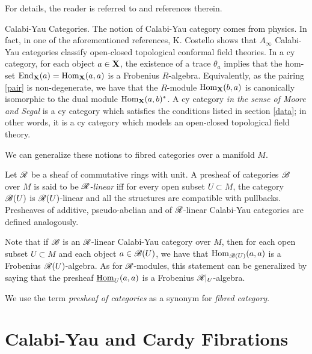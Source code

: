 For details, the reader is referred to
\cite{borceux:_cauchy_completion, natan:_envelope} and
references therein.

{\sc Calabi-Yau Categories.} The notion of Calabi-Yau category comes
from physics. In fact, in one of the aforementioned references,
K. Costello shows that $A_\infty$ Calabi-Yau categories classify
open-closed topological conformal field theories. In a {\sc cy} category,
for each object $a\in {\bf X}$, the existence of a trace $\theta_a$
implies that the hom-set $\operatorname{End}_{{\bf
    X}}(a)=\operatorname{Hom}_{{\bf X}}(a,a)$ is a Frobenius
$R$-algebra. Equivalently, as the pairing \eqref{pair} is
non-degenerate, we have that the $R$-module $\operatorname{Hom}_{{\bf
    X}}(b,a)$ is canonically isomorphic to the dual module
$\operatorname{Hom}_{{\bf X}}(a,b)^*$. A {\sc cy} category
\emph{in the sense of Moore and Segal} is a {\sc cy} category which
satisfies the conditions listed in section \ref{data}; in other words,
it is a {\sc cy} category which models an open-closed topological field
theory.

We can generalize these notions to fibred categories over a manifold
$M$.

\begin{defi}
  Let $\mathscr{R}$ be a sheaf of commutative rings with unit. A presheaf
  of categories $\mathscr{B}$ over $M$ is said to be
  \emph{$\mathscr{R}$-linear} iff for every open subset $U\subset M$, the
  category $\mathscr{B}(U)$ is $\mathscr{R}(U)$-linear and all the structures
  are compatible with pullbacks. Presheaves of additive,
  pseudo-abelian and of $\mathscr{R}$-linear Calabi-Yau categories are
  defined analogously.
\end{defi}

Note that if $\mathscr{B}$ is an $\mathscr{R}$-linear Calabi-Yau category over
$M$, then for each open subset $U\subset M$ and each object $a\in
\mathscr{B}(U)$, we have that $\operatorname{Hom}_{\mathscr{B}(U)}(a,a)$ is a
Frobenius $\mathscr{R}(U)$-algebra. As for $\mathscr{R}$-modules, this
statement can be generalized by saying that the presheaf
$\underline{\operatorname{Hom}}_U(a,a)$ is a Frobenius
$\mathscr{R}|_U$-algebra.

\begin{obs}
  We use the term \emph{presheaf of categories} as a synonym for
  \emph{fibred category}.
\end{obs}


\section{Calabi-Yau and Cardy Fibrations}

